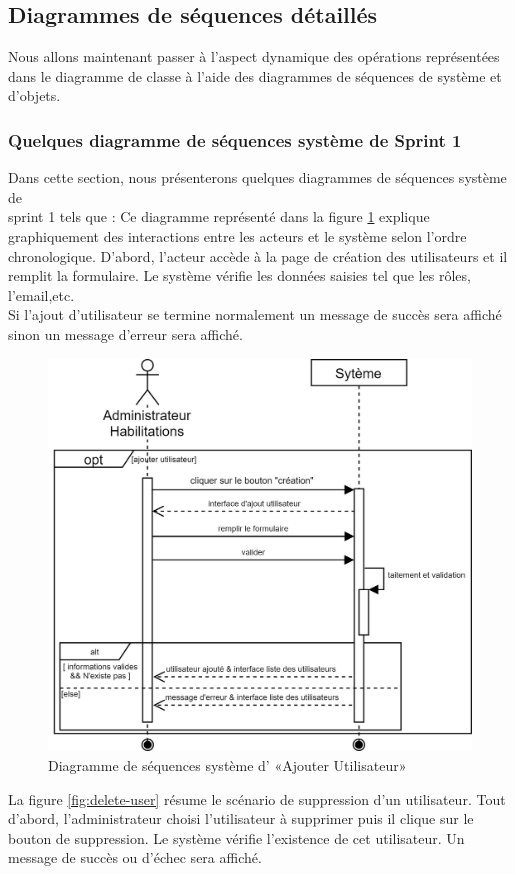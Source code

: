 \subsection{Diagrammes de séquences détaillés}
Nous allons maintenant passer à l’aspect dynamique des opérations représentées dans le diagramme de classe à l’aide des diagrammes de séquences de système et d’objets.
\subsubsection{Quelques diagramme de séquences système de Sprint 1}
Dans cette section, nous présenterons quelques diagrammes de séquences système de \\sprint 1 tels que : \newpage
{}\label{ajout-user}
Ce diagramme représenté dans la figure \ref{fig:add-user} explique graphiquement des interactions entre les acteurs et le système selon l'ordre chronologique. D'abord, l'acteur accède à la page de création des utilisateurs et il remplit la formulaire. Le système vérifie les données saisies tel que les rôles, l'email,etc.\\Si l'ajout d'utilisateur se termine normalement un message de succès sera affiché sinon un message d'erreur sera affiché.
\begin{figure}[H]
	\centering
	\includegraphics[width=0.65\linewidth]{img/conception/sequences/add-user}
	\caption[Diagramme de séquences système d’ «Ajouter Utilisateur»]{Diagramme de séquences système d’ «Ajouter Utilisateur»}
	\label{fig:add-user}
\end{figure}
\newpage
{}
La figure \ref{fig:delete-user} résume le scénario de suppression d'un utilisateur. Tout d'abord, l'administrateur choisi l'utilisateur à supprimer puis il clique sur le bouton de suppression. Le système vérifie l'existence de cet utilisateur. Un message de succès ou d'échec sera affiché.
